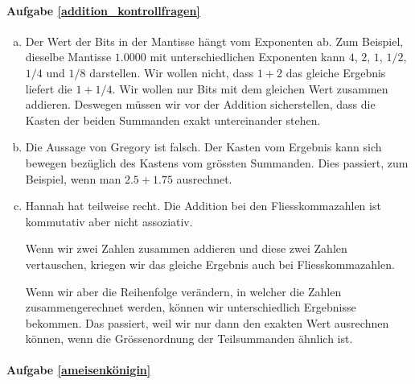 \paragraph{Aufgabe \ref{addition_kontrollfragen}}
\begin{enumerate}[(a)]
\item Der Wert der Bits in der Mantisse hängt vom Exponenten ab. Zum Beispiel, dieselbe Mantisse \(1.0000\) mit unterschiedlichen Exponenten kann \(4\), \(2\), \(1\), \(1/2\), \(1/4\) und \(1/8\) darstellen. Wir wollen nicht, dass \(1+2\) das gleiche Ergebnis liefert die \(1 + 1/4\). Wir wollen nur Bits mit dem gleichen Wert zusammen addieren. Deswegen müssen wir vor der Addition sicherstellen, dass die Kasten der beiden Summanden exakt untereinander stehen.

\item Die Aussage von Gregory ist falsch. Der Kasten vom Ergebnis kann sich bewegen bezüglich des Kastens vom grössten Summanden. Dies passiert, zum Beispiel, wenn man \(2.5 + 1.75\) ausrechnet.

\item Hannah hat teilweise recht. Die Addition bei den Fliesskommazahlen ist kommutativ aber nicht assoziativ.

Wenn wir zwei Zahlen zusammen addieren und diese zwei Zahlen vertauschen, kriegen wir das gleiche Ergebnis auch bei Fliesskommazahlen.

Wenn wir aber die Reihenfolge verändern, in welcher die Zahlen zusammengerechnet werden, können wir unterschiedlich Ergebnisse bekommen. Das passiert, weil wir nur dann den exakten Wert ausrechnen können, wenn die Grössenordnung der Teilsummanden ähnlich ist.
\end{enumerate}


\paragraph{Aufgabe \ref{ameisenkönigin}}

